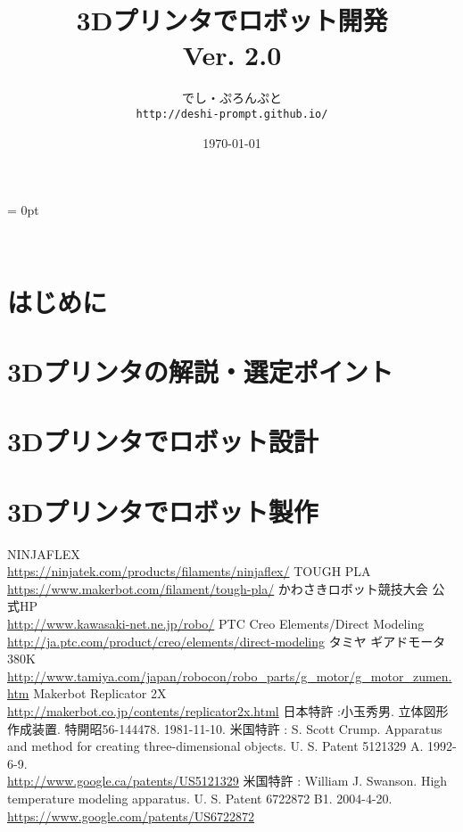 \documentclass[a4paper,11pt,oneside,openany]{jsbook}
\title{{\Huge \textbf{3Dプリンタでロボット開発}}\\ {\small Ver. 2.0}}
\author{でし・ぷろんぷと\\ \texttt{http://deshi-prompt.github.io/}}
\date{\today}
\begin{document}
\parindent = 0pt %

\thispagestyle{empty}

\newpage　

\frontmatter %
\tableofcontents %
\thispagestyle{empty} 
\mainmatter %


\setlength{\parskip}{1.5ex plus 0ex minus 0.2ex}

\chapter{はじめに}
\thispagestyle{fancy}


\chapter{3Dプリンタの解説・選定ポイント}
\thispagestyle{fancy}


\chapter{3Dプリンタでロボット設計}
\thispagestyle{fancy}


\chapter{3Dプリンタでロボット製作}
\thispagestyle{fancy}



\begin{thebibliography}{20}
NINJAFLEX \\ \url{https://ninjatek.com/products/filaments/ninjaflex/}
TOUGH PLA \\ \url{https://www.makerbot.com/filament/tough-pla/}
かわさきロボット競技大会 公式HP \\ \url{http://www.kawasaki-net.ne.jp/robo/}
PTC Creo Elements/Direct Modeling　\\ \url{http://ja.ptc.com/product/creo/elements/direct-modeling}
タミヤ ギアドモータ380K　\\ \url{http://www.tamiya.com/japan/robocon/robo_parts/g_motor/g_motor_zumen.htm}
Makerbot Replicator 2X　\\ \url{http://makerbot.co.jp/contents/replicator2x.html}
日本特許 :小玉秀男. 立体図形作成装置. 特開昭56-144478. 1981-11-10. 
米国特許 : S. Scott Crump. Apparatus and method for creating three-dimensional objects. U. S. Patent 5121329 A. 1992-6-9. \\ \url{http://www.google.ca/patents/US5121329}
米国特許 : William J. Swanson. High temperature modeling apparatus. U. S. Patent 6722872 B1. 2004-4-20.	\\ \url{https://www.google.com/patents/US6722872}

\end{thebibliography}
\thispagestyle{empty} 　
\end{document}
